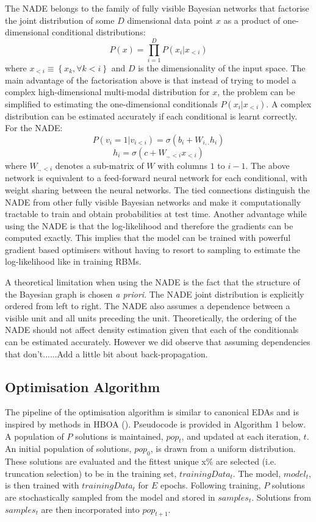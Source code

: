\documentclass[twoside]{article}
\begin{document}
The NADE belongs to the family of fully visible Bayesian networks that factorise the joint distribution of some $D$ dimensional data point $x$ as a product of one-dimensional conditional distributions:
$$ P(x) = \prod_{i=1}^{D} P(x_i|x_{<i})$$ where $x_{<i} \equiv \left\{ x_k, \forall k < i \right\} $  and $D$ is the dimensionality of the input space. The main advantage of the factorisation above is that instead of trying to model a complex high-dimensional multi-modal distribution for $x$, the problem can be simplified to estimating the one-dimensional conditionals $P(x_i|x_{<i})$. A complex distribution can be estimated accurately if each conditional is learnt correctly. For the NADE: 
$$P(v_i=1|v_{i<i}) =  \sigma(b_i + W_{i,.}h_i)$$
$$ h_i = \sigma(c+W_{.,<i}x_{<i})$$ where $W_{.,<i}$ denotes a sub-matrix of $W$ with columns $1$ to $i-1$. 
The above network is equivalent to a feed-forward neural network for each conditional, with weight sharing between the neural networks. The tied connections distinguish the NADE from other fully visible Bayesian networks and make it computationally tractable to train and obtain probabilities at test time. Another advantage while using the NADE is that the log-likelihood and therefore the gradients can be computed exactly. This implies that the model can be trained with powerful gradient based optimisers without having to resort to sampling to estimate the log-likelihood like in training RBMs. 

A theoretical limitation when using the NADE is the fact that the structure of the Bayesian graph is chosen \emph{a priori}. The NADE joint distribution is explicitly ordered from left to right. The NADE also assumes a dependence between a visible unit and all units preceding the unit. Theoretically, the ordering of the NADE should not affect density estimation given that each of the conditionals can be estimated accurately. However we did observe that assuming dependencies that don't......Add a little bit about back-propagation. 

\subsection{Optimisation Algorithm}

The pipeline of the optimisation algorithm is similar to canonical EDAs and is inspired by methods in HBOA (\cite{hboa}). Pseudocode is provided in Algorithm 1 below. A population of \(P\) solutions is maintained, \(pop_t\), and updated at each iteration, \(t\). An initial population of solutions, \(pop_0\), is drawn from a uniform distribution. These solutions are evaluated and the fittest unique x\% are selected (i.e. truncation selection) to be in the training set, \(trainingData_t\). The model, \(model_t\), is then trained with \(trainingData_t\) for \(E\) epochs. Following training, \(P\) solutions are stochastically sampled from the model and stored in \(samples_t\). Solutions from \(samples_t\) are then incorporated into \(pop_{t+1}\).
\end{document}
